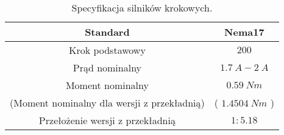 \begin{table}
	[b]	\caption{Specyfikacja silników krokowych.}
	\label{tab:stepper_motor_spec}
	\centering
	\begin{tabular}{|c|c|}
		\hline
		Standard & Nema17 \\
		\hline
		Krok podstawowy & $\num{200}$ \\
		\hline
		Prąd nominalny & $\SI{1.7}{A} - \SI{2}{A}$ \\
		\hline
		Moment nominalny 									 & $\SI{0.59}{Nm}$ \\
		(Moment nominalny dla wersji z  przekładnią)		 & ( $\SI{1,4504}{Nm}$ )\\
		\hline
		Przełożenie wersji z przekładnią & $\num{1}:\num{5.18}$ \\
		\hline
	\end{tabular}
\end{table}